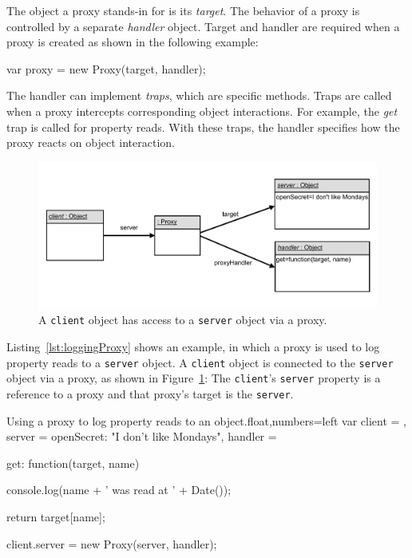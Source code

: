 The object a proxy stands-in for is its \emph{target}.
The behavior of a proxy is controlled by a separate \emph{handler} object.
Target and handler are required when a proxy is created as shown in the following example:

\begin{code}{}{}
var proxy = new Proxy(target, handler);
\end{code}
\label{lst:example}
\iffalse
\end{verbatim}\fi

The handler can implement \emph{traps}, which are specific methods.
Traps are called when a proxy intercepts corresponding object interactions.
For example, the \emph{get} trap is called for property reads.
With these traps, the handler specifies how the proxy reacts on object interaction.

\begin{figure}[h]
    \centering
    \includegraphics[width=\textwidth]{figures/5_implementation/1_loggingProxy.pdf}
    \caption{A \lstinline{client} object has access to a \lstinline{server} object via a proxy.}
    \label{fig:LoggingProxy}
\end{figure}

Listing~\ref{lst:loggingProxy} shows an example, in which a proxy is used to log property reads to a \lstinline{server} object.
A \lstinline{client} object is connected to the \lstinline{server} object via a proxy, as shown in Figure~\ref{fig:LoggingProxy}:
The \lstinline{client}'s \lstinline{server} property is a reference to a proxy and that proxy's target is the \lstinline{server}.

\begin{code}{Using a proxy to log property reads to an object.}{float,numbers=left}
var client = {},
    server = {openSecret: "I don't like Mondays"},
    handler = {
        get: function(target, name) {
            console.log(name + ' was read at ' + Date());
            
            return target[name];
        }
    }

client.server = new Proxy(server, handler);
\end{code}
\label{lst:loggingProxy}
\iffalse
\end{verbatim}\fi

